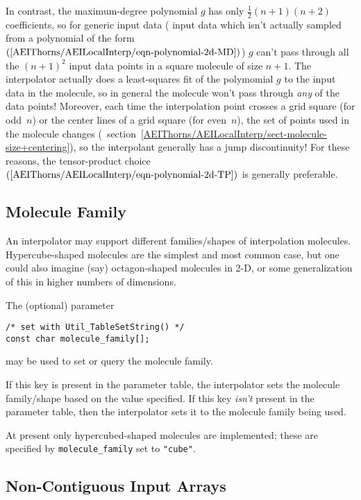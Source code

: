 In contrast, the maximum-degree polynomial $g$ has only
$\frac{1}{2} (n+1)(n+2)$ coefficients, so for generic input data
(\ie{} input data which isn't actually sampled from a polynomial of
the form~$(\ref{AEIThorns/AEILocalInterp/eqn-polynomial-2d-MD})$) $g$ can't pass
through all the $(n+1)^2$ input data points in a square molecule of
size $n+1$.  The interpolator actually does a least-squares fit of
the polymomial $g$ to the input data in the molecule, so in general
the molecule won't pass through {\em any\/} of the data points!
Moreover, each time the interpolation point crosses a grid square
(for odd~$n$) or the center lines of a grid square (for even~$n$),
the set of points used in the molecule changes 
(\cf{}~section~\ref{AEIThorns/AEILocalInterp/sect-molecule-size+centering}),
so the interpolant generally has a jump discontinuity!
For these reasons, the tensor-product
choice~$(\ref{AEIThorns/AEILocalInterp/eqn-polynomial-2d-TP})$ is generally
preferable.


\subsection{Molecule Family}
\label{AEIThorns/AEILocalInterp/sect-molecule-family}

An interpolator may support different families/shapes of interpolation
molecules.  Hypercube-shaped molecules are the simplest and most common
case, but one could also imagine (say) octagon-shaped molecules in 2-D,
or some generalization of this in higher numbers of dimensions.

The (optional) parameter
\begin{verbatim}
/* set with Util_TableSetString() */
const char molecule_family[];
\end{verbatim}
may be used to set or query the molecule family.

If this key is present in the parameter table, the interpolator sets
the molecule family/shape based on the value specified.
If this key {\em isn't\/} present in the parameter table, then the
interpolator sets it to the molecule family being used.

At present only hypercubed-shaped molecules are implemented; these
are specified by \verb|molecule_family| set to \verb|"cube"|.


\subsection{Non-Contiguous Input Arrays}
\label{AEIThorns/AEILocalInterp/sect-non-contiguous-inputs}

